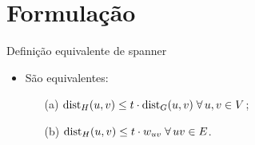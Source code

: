 \documentclass[dvipsnames]{beamer}
\newcommand{\dist}{{\rm dist}}
\begin{document}

\section{Formulação}
\begin{frame}{Definição equivalente de spanner \hyperlink{def_span}{}}
  \hypertarget{span}{}
  \begin{itemize}
    \item São equivalentes:
      \begin{itemize}
      \item[{\rm (a)}] $\dist_{H}(u,v) \le t \cdot \dist_{G}(u,v) \;\forall\,u,v \in V$;
        \item[{\rm (b)}] $\dist_{H}(u,v) \le t \cdot w_{uv} \;\forall\,uv \in E$.
        \end{itemize}
    \end{itemize}
\end{frame}
\end{document}
